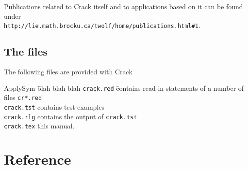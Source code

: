 \documentclass[12pt]{article}
\makeatletter
\def\dest#1{\hbox{\raise14pt\hbox{\special{pdf:dest (#1) [ @thispage /FitH
@ypos ]}}}}%
\makeatother
\begin{document}
Publications related to {\sc Crack} itself and to applications based
on it can be found under  \\
\verb+http://lie.math.brocku.ca/twolf/home/publications.html#1+.

\subsection{The files}
The following files are provided with {\sc Crack}
\begin{tabbing}
{\sc ApplySym} \= blah blah blah \kill
{\tt crack.red} \= contains read-in statements of a number
                      of files {\tt cr*.red} \\
{\tt crack.tst} \> contains test-examples \\
{\tt crack.rlg} \> contains the output of {\tt crack.tst} \\
{\tt crack.tex} \> this manual.
\end{tabbing}

\section{Reference}
\end{document}
